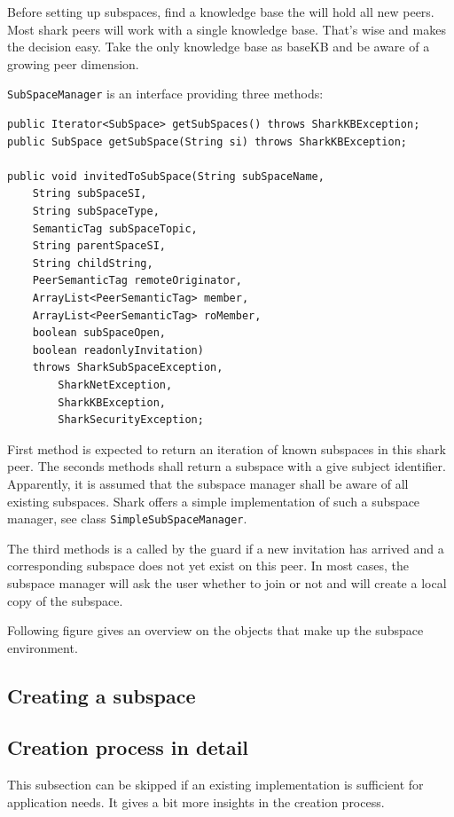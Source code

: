Before setting up subspaces, find a knowledge base the will hold all new peers.
Most shark peers will work with a single knowledge base. That's wise and makes the decision easy. Take the only knowledge base as baseKB and be aware of a growing peer dimension.

{\tt SubSpaceManager} is an interface providing three methods:

\begin{verbatim}
public Iterator<SubSpace> getSubSpaces() throws SharkKBException;
public SubSpace getSubSpace(String si) throws SharkKBException;

public void invitedToSubSpace(String subSpaceName, 
    String subSpaceSI, 
    String subSpaceType, 
    SemanticTag subSpaceTopic,
    String parentSpaceSI, 
    String childString,
    PeerSemanticTag remoteOriginator, 
    ArrayList<PeerSemanticTag> member, 
    ArrayList<PeerSemanticTag> roMember, 
    boolean subSpaceOpen, 
    boolean readonlyInvitation) 
    throws SharkSubSpaceException, 
        SharkNetException, 
        SharkKBException, 
        SharkSecurityException;
\end{verbatim}

First method is expected to return an iteration of known subspaces in this shark peer. The seconds methods shall return a subspace with a give subject identifier. Apparently, it is assumed that the subspace manager shall be aware of all existing subspaces. Shark offers a simple implementation of such a subspace manager, see class {\tt SimpleSubSpaceManager}.

The third methods is a called by the guard if a new invitation has arrived and a corresponding subspace does not yet exist on this peer. In most cases, the subspace manager will ask the user whether to join or not and will create a local copy of the subspace.

Following figure gives an overview on the objects that make up the subspace environment.


\subsection{Creating a subspace}

\subsection{Creation process in detail}
This subsection can be skipped if an existing implementation is sufficient for application needs. It gives a bit more insights in the creation process.

